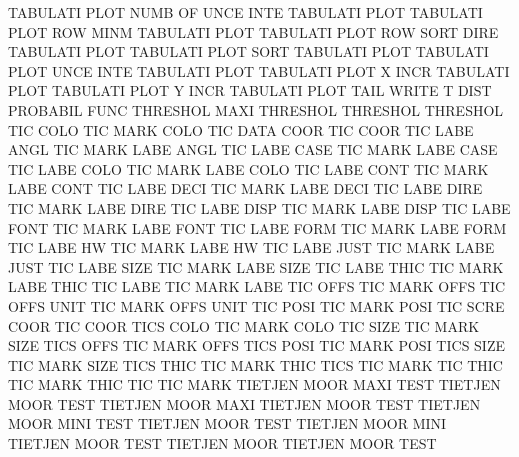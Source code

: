 TABULATI PLOT NUMB OF   UNCE INTE       TABULATI PLOT
TABULATI PLOT ROW  MINM                 TABULATI PLOT
TABULATI PLOT ROW  SORT DIRE            TABULATI PLOT
TABULATI PLOT SORT                      TABULATI PLOT
TABULATI PLOT UNCE INTE                 TABULATI PLOT
TABULATI PLOT X    INCR                 TABULATI PLOT
TABULATI PLOT Y    INCR                 TABULATI PLOT
TAIL                                    WRITE
T        DIST                           PROBABIL FUNC
THRESHOL MAXI                           THRESHOL
THRESHOL                                THRESHOL
TIC      COLO                           TIC      MARK COLO
TIC      DATA COOR                      TIC      COOR
TIC      LABE ANGL                      TIC      MARK LABE ANGL
TIC      LABE CASE                      TIC      MARK LABE CASE
TIC      LABE COLO                      TIC      MARK LABE COLO
TIC      LABE CONT                      TIC      MARK LABE CONT
TIC      LABE DECI                      TIC      MARK LABE DECI
TIC      LABE DIRE                      TIC      MARK LABE DIRE
TIC      LABE DISP                      TIC      MARK LABE DISP
TIC      LABE FONT                      TIC      MARK LABE FONT
TIC      LABE FORM                      TIC      MARK LABE FORM
TIC      LABE HW                        TIC      MARK LABE HW
TIC      LABE JUST                      TIC      MARK LABE JUST
TIC      LABE SIZE                      TIC      MARK LABE SIZE
TIC      LABE THIC                      TIC      MARK LABE THIC
TIC      LABE                           TIC      MARK LABE
TIC      OFFS                           TIC      MARK OFFS
TIC      OFFS UNIT                      TIC      MARK OFFS UNIT
TIC      POSI                           TIC      MARK POSI
TIC      SCRE COOR                      TIC      COOR
TICS     COLO                           TIC      MARK COLO
TIC      SIZE                           TIC      MARK SIZE
TICS     OFFS                           TIC      MARK OFFS
TICS     POSI                           TIC      MARK POSI
TICS     SIZE                           TIC      MARK SIZE
TICS     THIC                           TIC      MARK THIC
TICS                                    TIC      MARK
TIC      THIC                           TIC      MARK THIC
TIC                                     TIC      MARK
TIETJEN  MOOR MAXI TEST                 TIETJEN  MOOR TEST
TIETJEN  MOOR MAXI                      TIETJEN  MOOR TEST
TIETJEN  MOOR MINI TEST                 TIETJEN  MOOR TEST
TIETJEN  MOOR MINI                      TIETJEN  MOOR TEST
TIETJEN  MOOR                           TIETJEN  MOOR TEST

